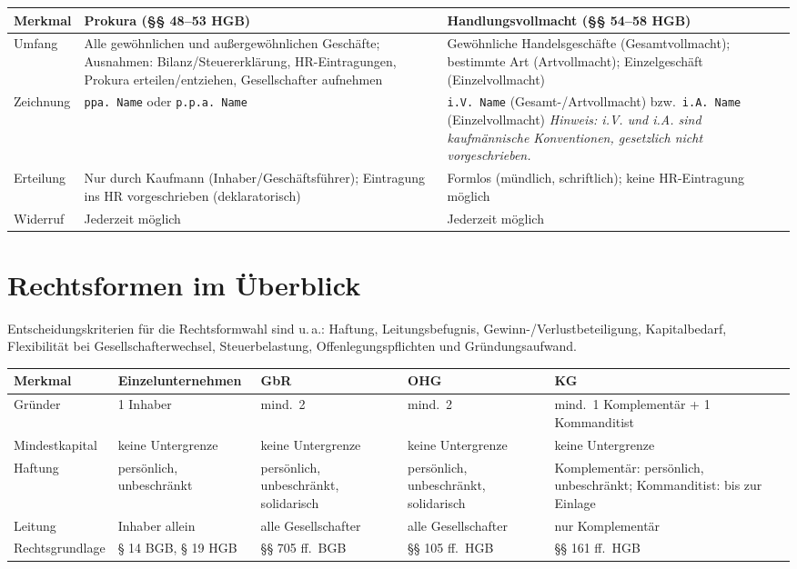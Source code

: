 \documentclass[11pt, a4paper]{article}
\begin{document}
\begin{center}
\begin{tabular}{p{3.5cm} p{5.5cm} p{4cm}}
\toprule
\textbf{Merkmal} & \textbf{Prokura (§§ 48–53 HGB)} & \textbf{Handlungsvollmacht (§§ 54–58 HGB)}\\
\midrule
Umfang & Alle gewöhnlichen und außergewöhnlichen Geschäfte; Ausnahmen: Bilanz/Steuererklärung,
HR-Eintragungen, Prokura erteilen/entziehen, Gesellschafter aufnehmen &
Gewöhnliche Handelsgeschäfte (Gesamtvollmacht); bestimmte Art (Artvollmacht); Einzelgeschäft
(Einzelvollmacht)\\
\addlinespace
Zeichnung & \texttt{ppa.~Name} oder \texttt{p.p.a.~Name} & \texttt{i.V.~Name} (Gesamt-/Artvollmacht) bzw.\ \texttt{i.A.~Name} (Einzelvollmacht) \newline \textit{Hinweis: i.V. und i.A. sind kaufmännische Konventionen, gesetzlich nicht vorgeschrieben.}\\
\addlinespace
Erteilung & Nur durch Kaufmann (Inhaber/Geschäftsführer); Eintragung ins HR vorgeschrieben
(deklaratorisch) & Formlos (mündlich, schriftlich); keine HR-Eintragung möglich\\
\addlinespace
Widerruf & Jederzeit möglich & Jederzeit möglich\\
\bottomrule
\end{tabular}
\end{center}

\section{Rechtsformen im Überblick}

Entscheidungskriterien für die Rechtsformwahl sind u.\,a.: Haftung, Leitungsbefugnis,
Gewinn-/Verlustbeteiligung, Kapitalbedarf, Flexibilität bei Gesellschafterwechsel,
Steuerbelastung, Offenlegungspflichten und Gründungsaufwand.

\begin{center}
\begin{tabular}{p{2.2cm} p{2.5cm} p{2.5cm} p{2.5cm} p{3cm}}
\toprule
\textbf{Merkmal} & \textbf{Einzelunternehmen} & \textbf{GbR} & \textbf{OHG} & \textbf{KG}\\
\midrule
Gründer & 1 Inhaber & mind.\ 2 & mind.\ 2 & mind.\ 1 Komplementär + 1 Kommanditist\\
Mindestkapital & keine Untergrenze & keine Untergrenze & keine Untergrenze & keine Untergrenze\\
Haftung & persönlich, unbeschränkt & persönlich, unbeschränkt, solidarisch & persönlich, unbeschränkt, solidarisch & Komplementär: persönlich, unbeschränkt; Kommanditist: bis zur Einlage\\
Leitung & Inhaber allein & alle Gesellschafter & alle Gesellschafter & nur Komplementär\\
Rechtsgrundlage & § 14 BGB, § 19 HGB & §§ 705 ff.\ BGB & §§ 105 ff.\ HGB & §§ 161 ff.\ HGB\\
\bottomrule
\end{tabular}
\end{center}
\end{document}
